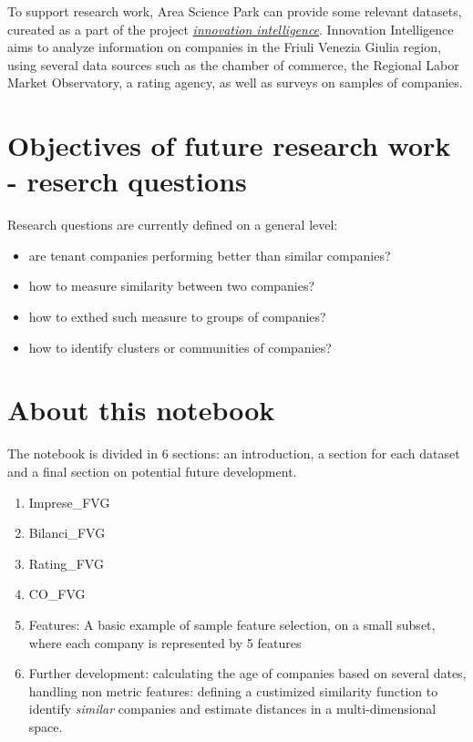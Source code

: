 \documentclass[
]{scrbook}
\providecommand{\tightlist}{%
  \setlength{\itemsep}{0pt}\setlength{\parskip}{0pt}}
\begin{document}
To support research work, Area Science Park can provide some relevant datasets, cureated as a part of the project \href{https://www.innovationintelligence.it/}{\emph{innovation intelligence}}. Innovation Intelligence aims to analyze information on companies in the Friuli Venezia Giulia region, using several data sources such as the chamber of commerce, the Regional Labor Market Observatory, a rating agency, as well as surveys on samples of companies.

\hypertarget{objectives-of-future-research-work---reserch-questions}{%
\section{Objectives of future research work - reserch questions}\label{objectives-of-future-research-work---reserch-questions}}

Research questions are currently defined on a general level:

\begin{itemize}
\tightlist
\item
  are tenant companies performing better than similar companies?
\item
  how to measure similarity between two companies?
\item
  how to exthed such measure to groups of companies?
\item
  how to identify clusters or communities of companies?
\end{itemize}

\hypertarget{about-this-notebook}{%
\section{About this notebook}\label{about-this-notebook}}

The notebook is divided in 6 sections: an introduction, a section for each dataset and a final section on potential future development.

\begin{enumerate}
\def\labelenumi{\arabic{enumi}.}
\tightlist
\item
  Imprese\_FVG
\item
  Bilanci\_FVG
\item
  Rating\_FVG
\item
  CO\_FVG
\item
  Features: A basic example of sample feature selection, on a small subset, where each company is represented by 5 features
\item
  Further development: calculating the age of companies based on several dates, handling non metric features: defining a custimized similarity function to identify \emph{similar} companies and estimate distances in a multi-dimensional space.
\end{enumerate}
\end{document}

